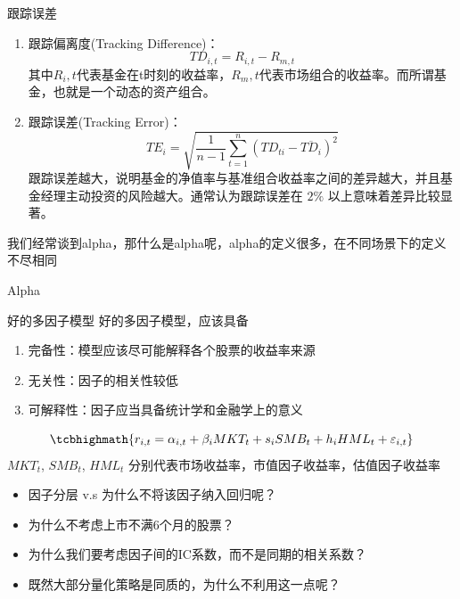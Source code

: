 \documentclass[12pt]{article}
\begin{document}
\begin{sdefinition}{跟踪误差}{}
\begin{enumerate}
	\item 跟踪偏离度(Tracking Difference)： $$ TD_{i,t} = R_{i,t} - R_{m,t}$$
	其中$R_i,t$代表基金在t时刻的收益率，$R_m,t$代表市场组合的收益率。而所谓基金，也就是一个动态的资产组合。
	\item 跟踪误差(Tracking Error)：$$
T E_i=\sqrt{\frac{1}{n-1} \sum_{t=1}^n\left(T D_{t i}-\overline{T D_i}\right)^2}
$$
跟踪误差越大，说明基金的净值率与基准组合收益率之间的差异越大，并且基金经理主动投资的风险越大。通常认为跟踪误差在 $2 \%$ 以上意味着差异比较显著。
\end{enumerate}
\end{sdefinition}
我们经常谈到alpha，那什么是alpha呢，alpha的定义很多，在不同场景下的定义不尽相同
\begin{sdefinition}{Alpha}{}

\end{sdefinition}

\begin{sdefinition}{好的多因子模型}{}
好的多因子模型，应该具备 
\begin{enumerate}
	\item 完备性：模型应该尽可能解释各个股票的收益率来源
	\item 无关性：因子的相关性较低
	\item 可解释性：因子应当具备统计学和金融学上的意义
\end{enumerate}
\end{sdefinition}

\begin{sexample}{}{}
$$
\tcbhighmath{r_{i, t}=\alpha_{i, t}+\beta_i M K T_t+s_i S M B_t+h_i H M L_t+\varepsilon_{i, t}}
$$
$MKT_t$, $SMB_t$, $HML_t$ 分别代表市场收益率，市值因子收益率，估值因子收益率
\end{sexample}




\begin{sremark}{}{}
\begin{itemize}
	\item 因子分层 v.s 为什么不将该因子纳入回归呢？
	\item 为什么不考虑上市不满6个月的股票？
	\item 为什么我们要考虑因子间的IC系数，而不是同期的相关系数？
	\item 既然大部分量化策略是同质的，为什么不利用这一点呢？
\end{itemize}
\end{sremark}
\end{document}
